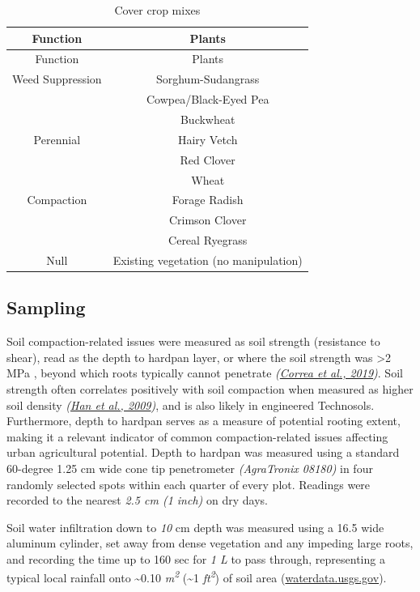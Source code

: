 \documentclass[
  12pt,
]{article}
\begin{document}
\begin{longtable}[]{@{}cc@{}}
\caption{\label{tab:crops}Cover crop mixes}\tabularnewline
\toprule()
Function & Plants \\
\midrule()
\endfirsthead
\toprule()
Function & Plants \\
\midrule()
\endhead
Weed Suppression & Sorghum-Sudangrass \\
& Cowpea/Black-Eyed Pea \\
& Buckwheat \\
Perennial & Hairy Vetch \\
& Red Clover \\
& Wheat \\
Compaction & Forage Radish \\
& Crimson Clover \\
& Cereal Ryegrass \\
Null & Existing vegetation (no manipulation) \\
\bottomrule()
\end{longtable}

\hypertarget{sampling}{%
\subsection{Sampling}\label{sampling}}

Soil compaction-related issues were measured as soil strength (resistance to shear), read as the depth to hardpan layer, or where the soil strength was \textgreater2 MPa
, beyond which roots typically cannot penetrate \emph{(\protect\hyperlink{ref-correa19}{Correa et al., 2019})}.
Soil strength often correlates positively with soil compaction when measured as higher soil density \emph{(\protect\hyperlink{ref-han09}{Han et al., 2009})}, and is also likely in engineered Technosols.
Furthermore, depth to hardpan serves as a measure of potential rooting extent, making it a relevant indicator of common compaction-related issues affecting urban agricultural potential.
Depth to hardpan was measured using a standard 60-degree 1.25 cm wide cone tip penetrometer \emph{(AgraTronix 08180)} in four randomly selected spots within each quarter of every plot.
Readings were recorded to the nearest \emph{2.5 cm (1 inch)} on dry days.

Soil water infiltration down to \emph{10}
cm
depth was measured using a 16.5
wide aluminum cylinder, set away from dense vegetation and any impeding large roots, and recording the time up to 160 sec for \emph{1 L}
to pass through, representing a typical local rainfall onto \textasciitilde0.10 \emph{m\textsuperscript{2}} (\textasciitilde1 \emph{ft\textsuperscript{2}}) of soil area (\url{waterdata.usgs.gov}).
\end{document}
